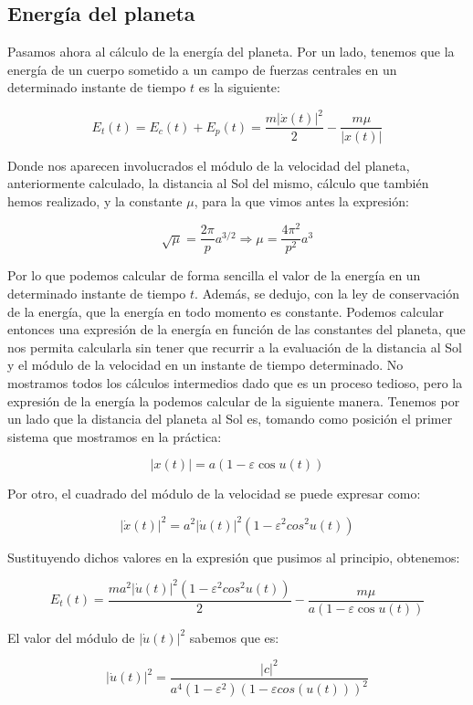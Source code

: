 \documentclass[12pt]{article}
\begin{document}
\subsection{Energía del planeta}

Pasamos ahora al cálculo de la energía del planeta. Por un lado,
tenemos que la energía de un cuerpo sometido a un campo de fuerzas
centrales en un determinado instante de tiempo $t$ es la siguiente:

\[
E_{t}(t) = E_{c}(t) + E_{p}(t) = \frac{m|\dot{x}(t)|^2}{2} -
\frac{m\mu}{|x(t)|}
\]

Donde nos aparecen involucrados el módulo de la velocidad del planeta,
anteriormente calculado, la distancia al Sol del mismo, cálculo que
también hemos realizado, y la constante $\mu$, para la que vimos antes
la expresión:

\[
\sqrt{\mu} = \frac{2\pi}{p}a^{3/2} \Rightarrow \mu = \frac{4
  \pi^2}{p^2}a^3
\]

Por lo que podemos calcular de forma sencilla el valor de la energía
en un determinado instante de tiempo $t$. Además, se dedujo, con la
ley de conservación de la energía, que la energía en todo momento es
constante. Podemos calcular entonces una expresión de la energía en
función de las constantes del planeta, que nos permita calcularla sin
tener que recurrir a la evaluación de la distancia al Sol y el módulo
de la velocidad en un instante de tiempo determinado. No mostramos
todos los cálculos intermedios dado que es un proceso tedioso, pero la
expresión de la energía la podemos calcular de la siguiente
manera. Tenemos por un lado que la distancia del planeta al Sol es,
tomando como posición el primer sistema que mostramos en la práctica:

\[
|x(t)| = a(1 - \varepsilon \cos{u(t)})
\]

Por otro, el cuadrado del módulo de la velocidad se puede expresar
como:

\[
|\dot{x}(t)|^2 = a^2|\dot{u}(t)|^2(1-\varepsilon^2cos^2{u(t)})
\]

Sustituyendo dichos valores en la expresión que pusimos al principio,
obtenemos:

\[
E_{t}(t) = \frac{ma^2|\dot{u}(t)|^2(1-\varepsilon^2cos^2{u(t)})}{2} -
\frac{m\mu}{a(1 - \varepsilon \cos{u(t)})}
\]

El valor del módulo de $|\dot{u}(t)|^2$ sabemos que es:

\[
|\dot{u}(t)|^2 = \frac{|c|^2}{a^4(1-\varepsilon^2)(1 - \varepsilon
  cos(u(t)))^2}
\]
\end{document}

